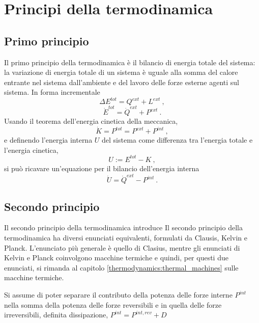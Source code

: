 
\chapter{Principi della termodinamica}\label{thermodynamics:principles}
\section{Primo principio}
Il primo principio della termodinamica è il bilancio di energia totale del sistema: la variazione di energia totale di un sistema è uguale alla somma del calore entrante nel sistema dall'ambiente e del lavoro delle forze esterne agenti sul sistema. In forma incrementale
\begin{equation}
  \Delta E^{tot} = Q^{ext} + L^{ext} \ ,
\end{equation}
\begin{equation}
  \dot{E}^{tot} = \dot{Q}^{ext} + P^{ext} \ .
\end{equation}
%
Usando il teorema dell'energia cinetica della meccanica,
\begin{equation}
  \dot{K} = P^{tot} = P^{ext} + P^{int} \ ,
\end{equation}
e definendo l'energia interna $U$ del sistema come differenza tra l'energia totale e l'energia cinetica,
\begin{equation}
  U := E^{tot} - K \ ,
\end{equation}
si può ricavare un'equazione per il bilancio dell'energia interna
\begin{equation}
  \dot{U} = \dot{Q}^{ext} - P^{int} \ .
\end{equation}

\section{Secondo principio}
Il secondo principio della termodinamica introduce
Il secondo principio della termodinamica ha diversi enunciati equivalenti, formulati da Clausis, Kelvin e Planck.
L'enunciato più generale è quello di Clasius, mentre gli enunciati di Kelvin e Planck coinvolgono macchine termiche e quindi, per questi due enunciati, si rimanda al capitolo \ref{thermodynamics:thermal_machines} sulle macchine termiche.

Si assume di poter separare il contributo della potenza delle forze interne $P^{int}$ nella somma della potenza delle forze reversibili e in quella delle forze irreversibili, definita dissipazione, $P^{int} = P^{int,rev} + D$

